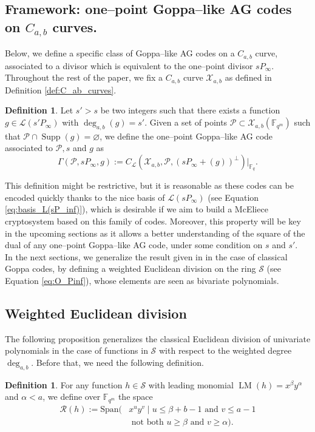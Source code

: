 \documentclass[peerreview]{IEEEtran}
\theoremstyle{plain}
\theoremstyle{definition}
\newtheorem{definition}[thm]{Definition}
\theoremstyle{remark}
\newcommand{\calP}{\mathcal{P}}
\newcommand{\calL}{\mathcal{L}}
\newcommand{\calR}{\mathcal{R}}
\newcommand{\calS}{\mathcal{S}}
\newcommand{\calX}{\mathcal{X}}
\newcommand{\fqm}{\mathbb{F}_{q^m}}
\newcommand{\fq}{\mathbb{F}_{q}}
\newcommand{\F}{\mathbb{F}}
\newcommand{\LM}[1]{\operatorname{LM}\left(#1\right)}
\newcommand{\Supp}{\operatorname{Supp}}
\newcommand{\degab}[1]{\deg_{a,b}\left(#1\right)}
\begin{document}
	\subsection{Framework: one--point Goppa--like AG codes on $C_{a,b}$ curves.}
	\noindent
	Below, we define a specific class of Goppa--like AG codes on a $C_{a,b}$ curve, associated to a divisor which is equivalent to the one--point divisor $sP_\infty$. 
	\noindent Throughout the rest of the paper, we fix a $C_{a,b}$ curve $\calX_{a,b}$ as defined in Definition \ref{def:C_ab_curves}.
	\begin{definition} \label{def:one--point_Goppa--like_AG_codes_on_C_a,b_curves}
		Let $s'>s$ be two integers such that there exists a function $g \in \calL(s'P_\infty)$ with $\degab{g}=s'$. Given a set of points  $\calP \subset \calX_{a,b}(\F_{q^m})$ such that $\calP \cap \Supp(g) = \varnothing$, we define the one--point Goppa--like AG code associated to $\calP,s$ and $g$ as 
		\[\Gamma(\calP,sP_\infty,g) := C_{\calL}(\calX_{a,b},\calP,(sP_\infty+(g))^{\perp})|_{\fq}.\]
	\end{definition}
	This definition might be restrictive, but it is reasonable as these codes can be encoded quickly thanks to the nice basis of $\calL(sP_\infty)$ (see Equation \eqref{eq:basis_L(sP_inf)}), which is desirable if we aim to build a McEliece cryptosystem based on this family of codes. Moreover, this property will be key in the upcoming sections as it allows a better understanding of the square of the dual of any one--point Goppa--like AG code, under some condition on $s$ and $s'$. \\
	
	\noindent In the next sections, we generalize the result given in \cite{MT21} in the case of classical Goppa codes, by defining a weighted Euclidean division on the ring $\calS$ (see Equation \eqref{eq:O_Pinf}), whose elements are seen as bivariate polynomials. 
	\subsection{Weighted Euclidean division}
	\noindent The following proposition generalizes the classical Euclidean division of univariate polynomials in the case of functions in $\calS$ with respect to the weighted degree $\deg_{a,b}$. Before that, we need the following definition.
	
	\begin{definition} \label{def:remainder_space}
		For any function $h \in \calS$ with leading monomial $\LM{h}=x^\beta y^\alpha$ and $\alpha < a$, we define over $\fqm$ the space
\[\begin{aligned}
		\calR(h) := \text{Span}(&x^u y^v \mid u \leq \beta + b-1 \text{ and } v\leq a-1\\& \text{ not both }  u \geq \beta \text{ and } v \geq \alpha).
\end{aligned}\]


	\end{definition}
	
\end{document}
